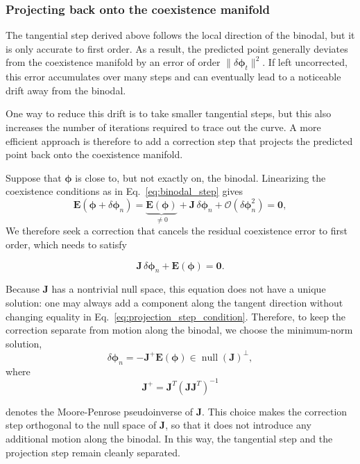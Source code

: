\documentclass[12pt]{article}
\begin{document}
\subsubsection{Projecting back onto the coexistence manifold}

The tangential step derived above follows the local direction of the binodal, but it is only accurate to first order.
As a result, the predicted point generally deviates from the coexistence manifold by an error of order \(\|\delta\boldsymbol{\phi}_t\|^2\).
If left uncorrected, this error accumulates over many steps and can eventually lead to a noticeable drift away from the binodal.

One way to reduce this drift is to take smaller tangential steps, but this also increases the number of iterations required to trace out the curve.
A more efficient approach is therefore to add a correction step that projects the predicted point back onto the coexistence manifold.

Suppose that \(\boldsymbol{\phi}\) is close to, but not exactly on, the binodal.
Linearizing the coexistence conditions as in Eq.~\eqref{eq:binodal_step} gives
\begin{equation}
\boldsymbol{E}(\boldsymbol{\phi}+\delta\boldsymbol{\phi}_n)
=
\underbrace{\boldsymbol{E}(\boldsymbol{\phi})}_{\neq 0}
+
\boldsymbol{J}\,\delta\boldsymbol{\phi}_n
+
\mathcal{O}(\delta\boldsymbol{\phi}_n^2)
=
\boldsymbol{0},
\end{equation}
We therefore seek a correction that cancels the residual coexistence error to first order, which needs to satisfy

\begin{equation}
\boldsymbol{J}\,\delta\boldsymbol{\phi}_n + \boldsymbol{E}(\boldsymbol{\phi}) = \boldsymbol{0}.
\label{eq:projection_step_condition}
\end{equation}

Because \(\boldsymbol{J}\) has a nontrivial null space, this equation does not have a unique solution: one may always add a component along the tangent direction without changing equality in Eq.~\eqref{eq:projection_step_condition}.
Therefore, to keep the correction separate from motion along the binodal, we choose the minimum-norm solution,
\[
\delta\boldsymbol{\phi}_n = -\boldsymbol{J}^+ \boldsymbol{E}(\boldsymbol{\phi})\in \operatorname{null}(\boldsymbol{J})^\perp,
\]
where 
\[\boldsymbol{J}^+ = \boldsymbol{J}^T(\boldsymbol{J}\boldsymbol{J}^T)^{-1}\]

denotes the Moore-Penrose pseudoinverse of \(\boldsymbol{J}\). This choice makes the correction step orthogonal to the null space of \(\boldsymbol{J}\), so that it does not introduce any additional motion along the binodal. In this way, the tangential step and the projection step remain cleanly separated.
\end{document}
